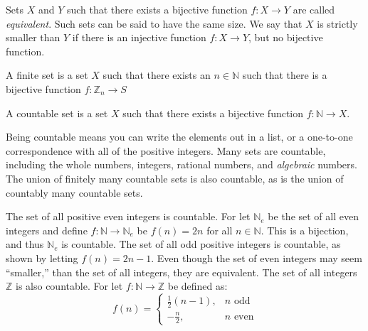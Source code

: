             Sets $X$ and $Y$ such that there
            exists a bijective function $f:X\rightarrow{Y}$ are
            called \textit{equivalent}. Such sets can be said
            to have the same size. We say that $X$ is strictly
            smaller than $Y$ if there is an injective function
            $f:X\rightarrow{Y}$, but no bijective function.
            \begin{definition}
                A finite set is a set $X$ such that there
                exists an $n\in\mathbb{N}$ such that there is
                a bijective function
                $f:\mathbb{Z}_{n}\rightarrow{S}$
            \end{definition}
            \begin{definition}
                A countable set is a set
                $X$ such that there exists a bijective
                function $f:\mathbb{N}\rightarrow{X}$.
            \end{definition}
            Being countable means you can write
            the elements out in a list, or a
            one-to-one correspondence with all of
            the positive integers. Many sets are countable,
            including the whole numbers, integers, rational
            numbers, and \textit{algebraic} numbers. The
            union of finitely many countable sets is also
            countable, as is the union of countably many
            countable sets.
            \begin{example}
                The set of all positive even integers is
                countable. For let $\mathbb{N}_{e}$ be the
                set of all even integers and define
                $f:\mathbb{N}\rightarrow\mathbb{N}_{e}$ be
                $f(n)=2n$ for all $n\in\mathbb{N}$. This is
                a bijection, and thus $\mathbb{N}_{e}$ is
                countable. The set of all odd positive integers
                is countable, as shown by letting
                $f(n)=2n-1$. Even though the set of even
                integers may seem ``smaller,'' than the set of
                all integers, they are equivalent. The set of
                all integers $\mathbb{Z}$ is also countable.
                For let $f:\mathbb{N}\rightarrow\mathbb{Z}$
                be defined as:
                \begin{equation}
                    f(n)=
                    \begin{cases}
                        \frac{1}{2}(n-1),&n\textrm{ odd}\\
                        -\frac{n}{2},&n\textrm{ even}
                    \end{cases}
                \end{equation}
            \end{example}
